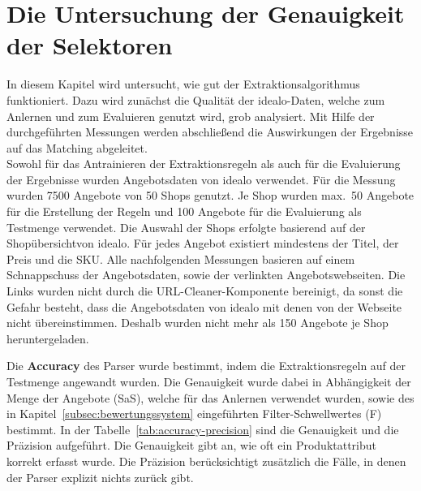 \section{Die Untersuchung der Genauigkeit der Selektoren}
\label{sec:evaluierung}

In diesem Kapitel wird untersucht, wie gut der Extraktionsalgorithmus funktioniert.
Dazu wird zunächst die Qualität der idealo-Daten, welche zum Anlernen und zum Evaluieren genutzt wird, grob analysiert.
Mit Hilfe der durchgeführten Messungen werden abschließend die Auswirkungen der Ergebnisse auf das Matching
abgeleitet.\\
\newline
Sowohl für das Antrainieren der Extraktionsregeln als auch für die Evaluierung der Ergebnisse wurden Angebotsdaten
von idealo verwendet.
Für die Messung wurden 7500 Angebote von 50 Shops genutzt.
Je Shop wurden max.\ 50 Angebote für die Erstellung der Regeln und 100 Angebote für die Evaluierung als Testmenge
verwendet.
Die Auswahl der Shops erfolgte basierend auf der Shopübersicht\footnotemark von idealo.
Für jedes Angebot existiert mindestens der Titel, der Preis und die SKU.
Alle nachfolgenden Messungen basieren auf einem Schnappschuss der Angebotsdaten, sowie der verlinkten Angebotswebseiten.
Die Links wurden nicht durch die URL-Cleaner-Komponente bereinigt, da sonst die Gefahr besteht, dass die
Angebotsdaten von idealo mit denen von der Webseite nicht übereinstimmen.
Deshalb wurden nicht mehr als 150 Angebote je Shop heruntergeladen.

Die \textbf{Accuracy} des Parser wurde bestimmt, indem die Extraktionsregeln auf der Testmenge angewandt wurden.
Die Genauigkeit wurde dabei in Abhängigkeit der Menge der Angebote (SaS), welche für das Anlernen verwendet wurden,
sowie des in Kapitel~\ref{subsec:bewertungssystem} eingeführten Filter-Schwellwertes (F) bestimmt.
In der Tabelle~\ref{tab:accuracy-precision} sind die Genauigkeit und die Präzision aufgeführt.
Die Genauigkeit gibt an, wie oft ein Produktattribut korrekt erfasst wurde.
Die Präzision berücksichtigt zusätzlich die Fälle, in denen der Parser explizit nichts zurück gibt.

